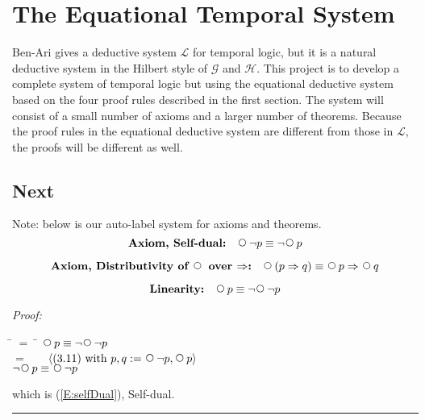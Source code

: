 \documentclass[fleqn, leqno]{article}
\newcommand{\lgap}{2pt}                             %
\newcommand{\mymathindent}{24pt}                    %
\newcommand{\Next}{\;\,\text{\raisebox{3.5pt}{\circle{6}}}}
\newcommand{\myqed}{\hfill\rule[-.23ex]{1.2ex}{2.0ex}}
\newcommand{\Gll} {\langle}                         %
\newcommand{\Ggg} {\rangle}                         %
\newcommand{\Hint}[1]     {\ \ \ $\Gll              \mbox{#1} \Ggg$ }   %
\begin{document}
\section{The Equational Temporal System}

Ben-Ari \cite{Ben} gives a deductive system $\mathcal{L}$ for temporal logic, but it is a
natural deductive system in the Hilbert style of $\mathcal{G}$ and $\mathcal{H}$. This project is to develop a complete system of
temporal logic but using the equational deductive system based on the four proof rules described
in the first section. The system will consist of a small number of axioms and a larger number of
theorems. Because the proof rules in the equational deductive system are different from those
in $\mathcal{L}$, the proofs will be different as well.\\



\subsection{Next}

Note: below is our auto-label system for axioms and theorems.\\

\begin{equation}\label{E:selfDual}
\textbf{Axiom, Self-dual:}\quad \Next\lnot p \equiv \lnot\Next p
\end{equation}

\begin{equation}\label{E:distNextImp}
\textbf{Axiom, Distributivity of $\Next$ over $\Rightarrow$:}\quad \Next (p \Rightarrow q) \equiv \Next p \Rightarrow \Next q
\end{equation}

\begin{equation}\label{E:linearity}
\textbf{Linearity:}\quad \Next p \equiv \lnot\Next\lnot p
\end{equation}

\emph{Proof:}
\begin{tabbing}
\hspace{\mymathindent} \= $= \;$ \= \kill
  \> \>   $\Next p \equiv \lnot\Next\lnot p$\\[\lgap]
  \> $=$  \>  \Hint{(3.11) with $p,q := \Next\lnot p, \Next p$} \\[\lgap]
  \> \>   $\lnot\Next p \equiv \Next\lnot p$
\end{tabbing}
which is (\ref{E:selfDual}), Self-dual. \myqed\\[\lgap]
\end{document}
